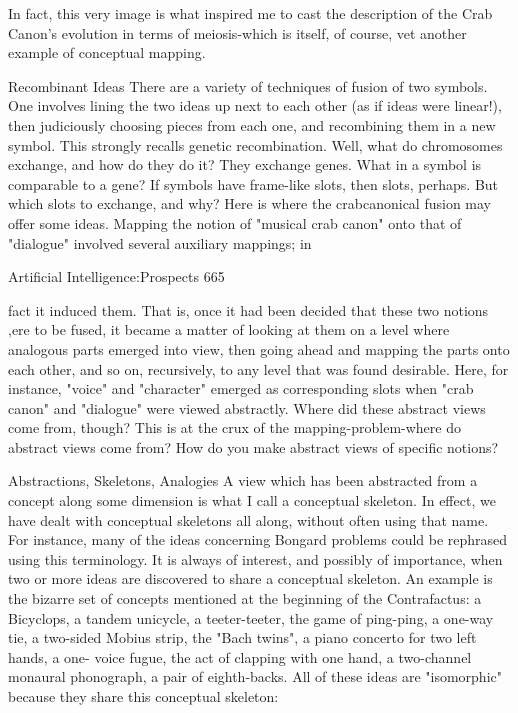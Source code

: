 In fact, this very image is what inspired me to cast the description of the Crab Canon's
evolution in terms of meiosis-which is itself, of course, vet another example of
conceptual mapping.

                                    Recombinant Ideas
There are a variety of techniques of fusion of two symbols. One involves lining the two
ideas up next to each other (as if ideas were linear!), then judiciously choosing pieces
from each one, and recombining them in a new symbol. This strongly recalls genetic
recombination. Well, what do chromosomes exchange, and how do they do it? They
exchange genes. What in a symbol is comparable to a gene? If symbols have frame-like
slots, then slots, perhaps. But which slots to exchange, and why? Here is where the
crabcanonical fusion may offer some ideas. Mapping the notion of "musical crab canon"
onto that of "dialogue" involved several auxiliary mappings; in




Artificial Intelligence:Prospects                                                     665

fact it induced them. That is, once it had been decided that these two notions ,ere to be
fused, it became a matter of looking at them on a level where analogous parts emerged
into view, then going ahead and mapping the parts onto each other, and so on,
recursively, to any level that was found desirable. Here, for instance, "voice" and
"character" emerged as corresponding slots when "crab canon" and "dialogue" were
viewed abstractly. Where did these abstract views come from, though? This is at the crux
of the mapping-problem-where do abstract views come from? How do you make abstract
views of specific notions?

                        Abstractions, Skeletons, Analogies
A view which has been abstracted from a concept along some dimension is what I call a
conceptual skeleton. In effect, we have dealt with conceptual skeletons all along, without
often using that name. For instance, many of the ideas concerning Bongard problems
could be rephrased using this terminology. It is always of interest, and possibly of
importance, when two or more ideas are discovered to share a conceptual skeleton. An
example is the bizarre set of concepts mentioned at the beginning of the Contrafactus: a
Bicyclops, a tandem unicycle, a teeter-teeter, the game of ping-ping, a one-way tie, a
two-sided Mobius strip, the "Bach twins", a piano concerto for two left hands, a one-
voice fugue, the act of clapping with one hand, a two-channel monaural phonograph, a
pair of eighth-backs. All of these ideas are "isomorphic" because they share this
conceptual skeleton:

